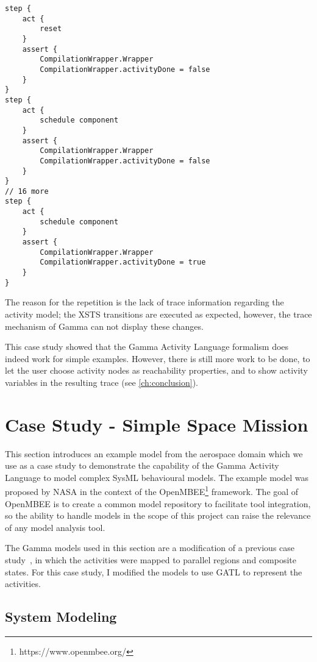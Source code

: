 \begin{lstlisting}[float,language=statechart, linewidth=0.80\textwidth, xleftmargin=0.20\textwidth, caption={The trace of the run formal verification.}, label={lst:cs1}]
step {
	act {
		reset
	}
	assert {
		CompilationWrapper.Wrapper
		CompilationWrapper.activityDone = false
	}
}
step {
	act {
		schedule component
	}
	assert {
		CompilationWrapper.Wrapper
		CompilationWrapper.activityDone = false
	}
}
// 16 more
step {
	act {
		schedule component
	}
	assert {
		CompilationWrapper.Wrapper
		CompilationWrapper.activityDone = true
	}
}
\end{lstlisting}

The reason for the repetition is the lack of trace information regarding the activity model; the XSTS transitions are executed as expected, however, the trace mechanism of Gamma can not display these changes.

This case study showed that the Gamma Activity Language formalism does indeed work for simple examples. However, there is still more work to be done, to let the user choose activity nodes as reachability properties, and to show activity variables in the resulting trace (see \autoref{ch:conclusion}).

\section{Case Study - Simple Space Mission}

This section introduces an example model from the aerospace domain which we use as a case study to demonstrate the capability of the Gamma Activity Language to model complex SysML behavioural models. The example model was proposed by NASA in the context of the OpenMBEE\footnote{https://www.openmbee.org/} framework. The goal of OpenMBEE is to create a common model repository to facilitate tool integration, so the ability to handle models in the scope of this project can raise the relevance of any model analysis tool.

The Gamma models used in this section are a modification of a previous case study~\cite{mixed_statecharts_2020}, in which the activities were mapped to parallel regions and composite states. For this case study, I modified the models to use GATL to represent the activities.

\subsection{System Modeling}

